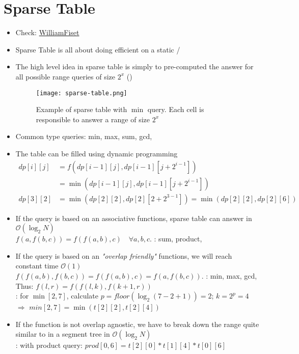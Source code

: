 \section{Sparse Table}
\begin{itemize}
	\item Check: \href{https://youtu.be/uUatD9AudXo}{WilliamFiset}
	\item Sparse Table is all about doing efficient  on a static / 
	\item The high level idea in sparse table is simply to pre-computed the answer for all possible range queries of size $ 2^x $ ()
	\begin{figure}[hbt!]
		\centering
		\texttt{[image: sparse-table.png]}
		\caption{Example of sparse table with $ \min $ query. Each cell is responsible to answer a range of size $ 2^x $}
		\label{fig:sparse-table}
	\end{figure}
	\item Common type queries: min, max, sum, gcd, \etc
	\item The table can be filled using dynamic programming
	\begin{align*}
		dp[i][j] & = f(dp[i-1][j], dp[i-1][j+2^{i-1}]) \\
		& = \min(dp[i-1][j], dp[i-1][j+2^{i-1}]) \\
		dp[3][2] & = \min(dp[2][2], dp[2][2 + 2^{3-1}]) = \min(dp[2][2], dp[2][6])
	\end{align*}
	\item If the query is based on an associative functions, sparse table can answer in $ \mathcal{O} (\log_2 N) $\\
	$ f(a, f(b, c)) = f(f(a, b), c) \quad\forall a, b, c$. \Eg: sum, product, \etc
	\item If the query is based on an \textit{"overlap friendly"} functions, we will reach constant time $ \mathcal{O} (1) $\\
	$ f(f(a, b), f(b, c)) = f(f(a, b), c) = f(a, f(b, c)) $. \Eg: min, max, gcd, \etc\\
	Thus: $ f(l, r) = f(f(l, k), f(k+1, r)) $\\
	\Eg: for $ \min[2,7] $, calculate $ p = floor(\log_2(7-2+1)) = 2 $; $ k = 2^p = 4 $\\
	$\Rightarrow$ $ min[2, 7] = \min(t[2][2], t[2][4]) $
	\item If the function is not overlap agnostic, we have to break down the range quite similar to in a segment tree in $ \mathcal{O} (\log_2 N) $\\
	\Eg: with product query: $ prod[0, 6] = t[2][0] * t[1][4] * t[0][6] $
\end{itemize}

